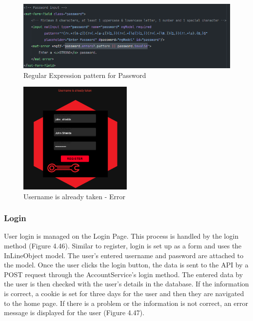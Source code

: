 \begin{figure}[H]
    \caption{Regular Expression pattern for Password}
    \label{image:passwordRegEx}
    \centering
    \includegraphics[width=1.0\textwidth]{images/repota/account_pages/password_regex.png}
\end{figure}

\begin{figure}[H]
    \caption{Username is already taken - Error}
    \label{image:nameTaken}
    \centering
    \includegraphics[width=0.5\textwidth]{images/repota/UI/username_taken.png}
\end{figure}

\subsubsection{Login}
User login is managed on the Login Page. This process is handled by the login method (Figure 4.46). Similar to register, login is set up as a form and uses the InLineObject model. The user's entered username and password are attached to the model. Once the user clicks the login button, the data is sent to the API by a POST request through the AccountService's login method. The entered data by the user is then checked with the user's details in the database. If the information is correct, a cookie is set for three days for the user and then they are navigated to the home page. If there is a problem or the information is not correct, an error message is displayed for the user (Figure 4.47). 

